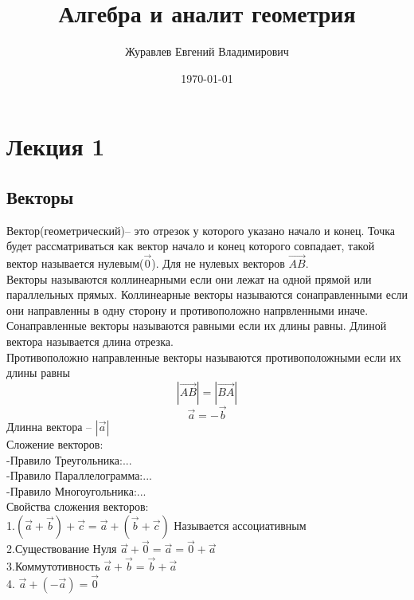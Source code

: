 \documentclass[a4paper, 12pt]{article}
\title{Алгебра и аналит геометрия }
\author{Журавлев Евгений Владимирович}
\date{\today}
\begin{document}
\sffamily
\maketitle
\section{Лекция 1}
\subsection{Векторы}
Вектор(геометрический)-- это отрезок у которого указано начало и конец.
Точка будет рассматриваться как вектор начало и конец которого совпадает, такой вектор называется нулевым($\vec{0}$). Для не нулевых векторов $  \vec{AB}$.\\
Векторы называются коллинеарными если они лежат на одной прямой или параллельных прямых. Коллинеарные векторы называются сонаправленными если они направленны в одну сторону и противоположно напрвленными иначе.\\
Сонаправленные векторы называются равными если их длины равны. Длиной вектора называется длина отрезка.\\
Противоположно направленные векторы называются противоположными если их длины равны \[
	|\vec{AB}| = |\vec{BA}|
\] 
\[
	\vec{a} = -\vec{b}		
\]
Длинна вектора -- $|\vec{a}|$\\
Сложение векторов: \\
-Правило Треугольника:...\\
-Правило Параллелограмма:...\\
-Правило Многоугольника:...\\
Свойства сложения векторов:\\
1.$ (\vec{a} + \vec{b})+\vec{c} = \vec{a} + (\vec{b}+\vec{c}) $ Называется ассоциативным\\
2.Существование Нуля $ \vec{a} + \vec{0} = \vec{a} = \vec{0} + \vec{a} $\\
3.Коммутотивность $ \vec{a} + \vec{b}= \vec{b} + \vec{a} $\\
4. $ \vec{a} + (-\vec{a}) = \vec{0} $\\
\end{document}
